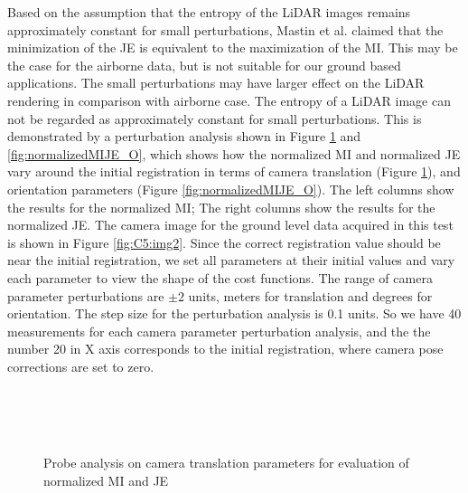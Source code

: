 Based on the assumption that the entropy of the LiDAR images remains approximately constant for small perturbations, Mastin et al. \cite{MastinFisher09} claimed that the minimization of the JE is equivalent to the maximization of the MI. 
This may be the case for the airborne data, but is not suitable for our ground based applications. The small perturbations may have larger effect on the LiDAR rendering in comparison with airborne case. The entropy of a LiDAR image can not be regarded as approximately constant for small perturbations. This is demonstrated by a perturbation analysis shown in Figure \ref{fig:normalizedMIJE_T} and \ref{fig:normalizedMIJE_O}, which 
shows how the normalized MI and normalized JE vary around the initial registration in terms of camera translation (Figure \ref{fig:normalizedMIJE_T}), and orientation
parameters (Figure \ref{fig:normalizedMIJE_O}). The left columns
show the results for the normalized MI; The right
columns show the results for the normalized JE. The camera image for the ground level data acquired in this test is shown in Figure \ref{fig:C5:img2}. Since the correct registration value should be near the initial registration, we set all parameters at their initial values and vary each parameter to view the shape of the cost functions. The range of camera parameter perturbations are $\pm 2$ units, meters for translation and degrees for orientation. The step size for the perturbation analysis is 0.1 units. So we have 40 measurements for each camera parameter perturbation analysis, and the the number 20 in X axis  corresponds to the initial registration, where camera pose corrections are set to zero.  


\begin{figure}[H]
\centering
{} 
 \\
 \\
 \\
\caption{Probe analysis on camera translation parameters for evaluation of normalized MI and JE} 
\label{fig:normalizedMIJE_T}
\end{figure}

